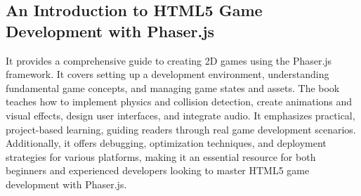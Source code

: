 \subsection*{An Introduction to HTML5 Game Development with Phaser.js}
It provides a comprehensive guide to creating 2D games using the Phaser.js framework. It covers setting up a development environment, understanding fundamental game concepts, and managing game states and assets. The book teaches how to implement physics and collision detection, create animations and visual effects, design user interfaces, and integrate audio. It emphasizes practical, project-based learning, guiding readers through real game development scenarios. Additionally, it offers debugging, optimization techniques, and deployment strategies for various platforms, making it an essential resource for both beginners and experienced developers looking to master HTML5 game development with Phaser.js.\cite{faas2017introduction}